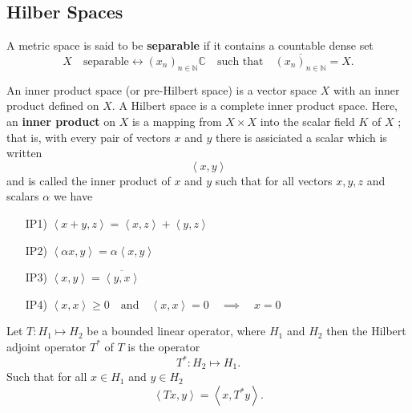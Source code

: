 \documentclass{article}
\theoremstyle{remark}
\begin{document}
\subsection{Hilber Spaces}%
\label{sub:hilber_spaces}
\begin{definition}[Separable]
  A metric space is said to be \textbf{separable} if it contains a countable dense set
  \[
 X \quad \text{separable} \leftrightarrow \left( x_{n} \right)_{n \in \mathbb{N}} \mathbb{C} \quad \text{such that} \quad   \overline{\left( x_{n} \right)_{n \in\mathbb{N}} } = X  .
  \] 
\end{definition}



\begin{definition}
  An inner product space (or pre-Hilbert space) is a vector space $X$ with an inner product defined on  $X$. A Hilbert space is a complete inner product space. Here, an \textbf{inner product} on $X$ is a mapping from $X \times X $ into the scalar field $K$ of $X$ ; that is,  with every pair of vectors $x$ and $y$ there is assiciated a scalar which is written \[
  \left<x,y \right>
  \] and is called the inner product of $x$ and  $y$ such that for all vectors $x,y,z$ and scalars $\alpha$ we have 
  \begin{enumerate}
    \item[IP1)] $\left< x +y ,z\right> = \left<x,z \right> + \left<y,z \right>$ 
    \item[IP2)] $\left<\alpha x , y \right> = \alpha \left<x,y \right> $
    \item[IP3)] $ \left<x,y \right> =\overline{\left<  y,x\right>} $
    \item[IP4)] $ \left<x,x \right> \ge 0 \quad \text{and} \quad \left<x,x \right> = 0 \quad \implies \quad x= 0    $
  \end{enumerate}
  
\end{definition}

\begin{definition}
  Let $T: H_1 \mapsto H_2$ be a bounded linear operator, where $H_1$ and $H_2$ then the Hilbert adjoint operator $T^{*}$ of $T$ is the operator \[
  T^{*}: H_2 \mapsto H_1 .
  \] 
  Such that for all $x \in H_1$ and $y \in H_2$ 
  \begin{equation}
  \label{eq:ajoint}
  \left<Tx,y \right> = \left<x,  T^{*}y \right>
  .\end{equation}
  
\end{definition}
\end{document}
